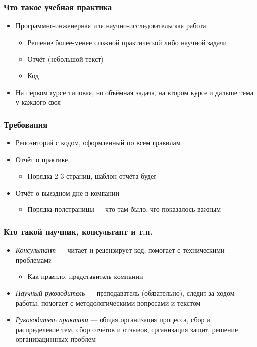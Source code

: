 \documentclass{../../slides-style}
\begin{document}
    
    \begin{frame}[plain]
        \titlepage
    \end{frame}

    \begin{frame}
        \frametitle{Что такое учебная практика}
        \begin{itemize}
            \item Программно-инженерная или научно-исследовательская работа%
            \begin{itemize}
                \item Решение более-менее сложной практической либо научной задачи
                \item Отчёт (небольшой текст)
                \item Код
            \end{itemize}
            \item На первом курсе типовая, но объёмная задача, на втором курсе и дальше тема у каждого своя
        \end{itemize}
    \end{frame}

    \begin{frame}
        \frametitle{Требования}
        \begin{itemize}
            \item Репозиторий с кодом, оформленный по всем правилам
            \item Отчёт о практике
            \begin{itemize}
                \item Порядка 2-3 страниц, шаблон отчёта будет
            \end{itemize}
            \item Отчёт о выездном дне в компании
            \begin{itemize}
                \item Порядка полстраницы --- что там было, что показалось важным
            \end{itemize}
        \end{itemize}
    \end{frame}

    \begin{frame}
        \frametitle{Кто такой научник, консультант и т.п.}
        \begin{itemize}
            \item \textit{Консультант} --- читает и рецензирует код, помогает с техническими проблемами
            \begin{itemize}
                \item Как правило, представитель компании
            \end{itemize}
            \item \textit{Научный руководитель} --- преподаватель (обязательно), следит за ходом работы, помогает с методологическими вопросами и текстом
            \item \textit{Руководитель практики} --- общая организация процесса, сбор и распределение тем, сбор отчётов и отзывов, организация защит, решение организационных проблем
        \end{itemize}
    \end{frame}
\end{document}
